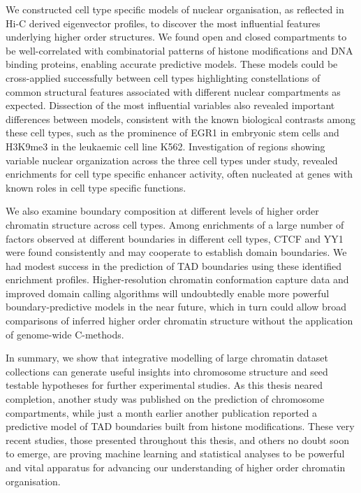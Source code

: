 \documentclass[a4paper,11pt,oneside]{book}
\begin{document}
We constructed cell type specific models of nuclear
organisation, as reflected in Hi-C derived eigenvector profiles, to
discover the most influential features underlying higher order
structures. We found open and closed compartments to be
well-correlated with combinatorial patterns of histone modifications
and DNA binding proteins, enabling accurate predictive models. These
models could be cross-applied successfully between cell types
highlighting constellations of common structural features associated
with different nuclear compartments as expected. Dissection of the
most influential variables also revealed important differences between
models, consistent with the known biological contrasts among these
cell types, such as the prominence of EGR1 in embryonic stem cells and
H3K9me3 in the leukaemic cell line K562. Investigation of regions showing
variable nuclear organization across the three cell types under study,
revealed enrichments for cell type specific enhancer activity, often
nucleated at genes with known roles in cell type specific
functions.

We also examine boundary composition at different levels of higher order chromatin structure across cell types. Among
enrichments of a large number of factors observed at different
boundaries in different cell types, CTCF and YY1 were found
consistently and may cooperate to establish domain boundaries. We had modest success in the prediction of TAD boundaries using these identified enrichment profiles. Higher-resolution chromatin conformation capture data and improved domain calling algorithms will undoubtedly enable more powerful boundary-predictive models in the near future, which in turn could allow broad comparisons of inferred higher order chromatin structure without the application of genome-wide C-methods.

In summary, we show that integrative modelling of large chromatin dataset
collections can generate useful insights into chromosome structure and seed testable hypotheses for further
experimental studies. As this thesis neared completion, another study was published on the prediction of chromosome compartments,\cite{Fortin2015a} while just a month earlier another publication reported a predictive model of TAD boundaries built from histone modifications.\cite{Huang2015} These very recent studies, those presented throughout this thesis, and others no doubt soon to emerge, are proving machine learning and statistical analyses to be powerful and vital apparatus for advancing our understanding of higher order chromatin organisation.

\ifstandalone
\begin{small}

\end{small}
\fi
\end{document}
